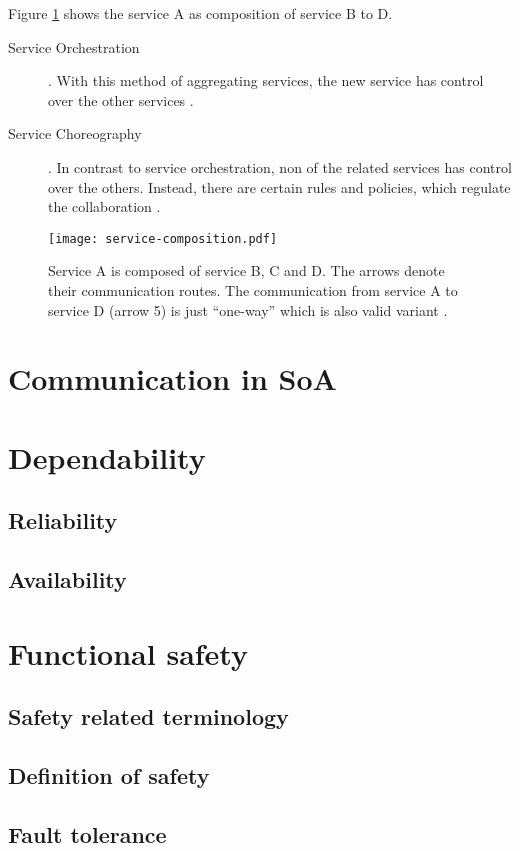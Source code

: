 Figure \ref{fig:service-composition} shows the service A as composition of service B to D.

\begin{description}
	\item [Service Orchestration] .
	With this method of aggregating services, the new service has control over the other services \cite{josuttis}.
	\item [Service Choreography] .
	In contrast to service orchestration, non of the related services has control over the others. Instead, there are certain rules and policies, which regulate the collaboration \cite{josuttis}.
\end{description}

\begin{figure}[ht]
\centering
\texttt{[image: service-composition.pdf]}
\caption{Service A is composed of service B, C and D. The arrows denote their communication routes. The communication from service A to service D (arrow 5) is just ``one-way'' which is also valid variant \cite[p.40]{erl2011}.}
\label{fig:service-composition}
\end{figure}

\section{Communication in SoA}

\section{Dependability}
\subsection{Reliability}
\subsection{Availability}

\section{Functional safety}
\subsection{Safety related terminology}
\subsection{Definition of safety}
\subsection{Fault tolerance}